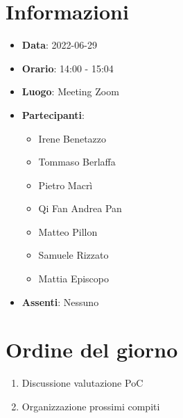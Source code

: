 \section{Informazioni}
	\begin{itemize}
		\item \textbf{Data}: 2022-06-29     %
		\item \textbf{Orario}:       14:00 - 15:04       %
		\item \textbf{Luogo}: Meeting Zoom
		\item \textbf{Partecipanti}:
		\begin{itemize}
			\item Irene Benetazzo
			\item Tommaso Berlaffa
			\item Pietro Macrì
			\item Qi Fan Andrea Pan
			\item Matteo Pillon
			\item Samuele Rizzato
			\item Mattia Episcopo
		\end{itemize}
        \item \textbf{Assenti}: Nessuno
	\end{itemize}
    
	\section{Ordine del giorno}
	\begin{enumerate}
		\item Discussione valutazione PoC
		\item Organizzazione prossimi compiti
	\end{enumerate}
	\newpage
